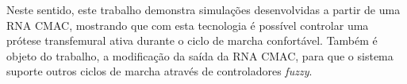 Neste sentido, este trabalho demonstra simulações desenvolvidas a partir de uma RNA CMAC, mostrando que com esta tecnologia é possível controlar uma prótese transfemural ativa durante o ciclo de marcha confortável.
Também é objeto do trabalho, a modificação da saída da RNA CMAC, para que o sistema suporte outros ciclos de marcha através de controladores \emph{fuzzy}.

